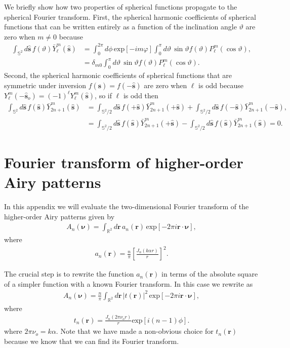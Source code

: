\documentclass[]{osa-article}
\providecommand{\mb}[1]{\mathbf{#1}}
\providecommand{\so}{\mathbf{\hat{s}}_o}
\providecommand{\mh}[1]{\mathbf{\hat{#1}}}
\providecommand{\mbb}[1]{\mathbb{#1}}
\providecommand{\bs}[1]{\boldsymbol{#1}}
\begin{document}
We briefly show how two properties of spherical functions propagate to the
spherical Fourier transform. First, the spherical harmonic coefficients of
spherical functions that can be written entirely as a function of the
inclination angle $\vartheta$ are zero when $m\neq0$ because
\begin{align}
  \int_{\mbb{S}^2}d\mh{s}\, f(\vartheta)\bar{Y}_\ell^m(\mh{s}) &= \int_0^{2\pi}d\phi\, \text{exp}[-im\varphi]\int_0^{\pi}d\vartheta\, \sin\vartheta f(\vartheta)P_\ell^m(\cos\vartheta),\\ &= \delta_{m0}\int_0^{\pi}d\vartheta\, \sin\vartheta f(\vartheta)P_\ell^m(\cos\vartheta).
\end{align}
Second, the spherical harmonic coefficients of spherical functions that are
symmetric under inversion $f(\mh{s}) = f(-\mh{s})$ are zero when $\ell$ is odd
because $Y_\ell^m(-\so) = (-1)^\ell Y_\ell^m(\mh{s})$, so if $\ell$ is odd then
\begin{align}
  \int_{\mbb{S}^2}d\mh{s}\, f(\mh{s})\bar{Y}_{2n+1}^m(\mh{s}) &= \int_{\mbb{S}^2/2}d\mh{s}\, f(+\mh{s})\bar{Y}_{2n+1}^m(+\mh{s}) + \int_{\mbb{S}^2/2}d\mh{s}\, f(-\mh{s})\bar{Y}_{2n+1}^m(-\mh{s}),\\
&=\int_{\mbb{S}^2/2}d\mh{s}\, f(\mh{s})\bar{Y}_{2n+1}^m(+\mh{s}) - \int_{\mbb{S}^2/2}d\mh{s}\, f(\mh{s})\bar{Y}_{2n+1}^m(\mh{s}) = 0.                                                                
\end{align}
\section{Fourier transform of higher-order Airy patterns} \label{sec:airy}
In this appendix we will evaluate the two-dimensional Fourier transform of the
higher-order Airy patterns given by
\begin{align}
  A_n(\bs{\nu}) = \int_{\mbb{R}^2}d\mb{r}\, a_n(\mb{r})\, \text{exp}\left[-2\pi i\mb{r}\cdot\bs{\nu}\right],  \label{eq:ftA}
\end{align}
where 
\begin{align}
    a_n(\mb{r}) =  \frac{n}{\pi}\left[\frac{J_n(k\alpha r)}{r}\right]^2.
\end{align}

The crucial step is to rewrite the function $a_n(\mb{r})$ in terms of the absolute
square of a simpler function with a known Fourier transform. In this case we
rewrite as
\begin{align}
  A_n(\bs{\nu}) = \frac{n}{\pi}\int_{\mbb{R}^2}d\mb{r}\, |t(\mb{r})|^2\, \text{exp}\left[-2\pi i\mb{r}\cdot\bs{\nu}\right],  \label{eq:ftA}
\end{align}
where 
\begin{align}
t_n(\mb{r}) = \frac{J_n(2\pi\nu_o r)}{r}\text{exp}[i(n-1)\phi].
\end{align}
where $2\pi\nu_o = k\alpha$. Note that we have made a non-obvious choice for
$t_n(\mb{r})$ because we know that we can find its Fourier transform.
\end{document}
